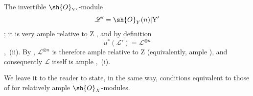 \begin{corollary}[18.12.17]
The invertible $\sh{O}_{Y'}$-module
\[
  \mathscr{L}'=\sh{O}_Y(n)|\mathrm{Y}'
\]
; it is very ample relative to $\mathrm{Z}$ , and by definition
\[
  u^*(\mathscr{L}')=\mathscr{L}^{\otimes n}
\]
,~(ii). By , $\mathscr{L}^{\otimes n}$ is therefore ample relative to $\mathrm{Z}$ (equivalently, ample ), and consequently $\mathscr{L}$ itself is ample ,~(i).

We leave it to the reader to state, in the same way, conditions equivalent to those of  for relatively ample $\sh{O}_X$-modules.
\end{corollary}

